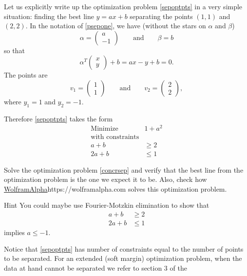 \documentclass{article}
\begin{document}
  \begin{example}
    Let us explicitly write up the optimization problem \eqref{sepoptpts} in
    a very simple situation: finding the best line $y = a x + b$ separating the points
    $(1, 1)$ and $(2, 2)$. In the notation of \eqref{psepone}, we have (without the
    stars on $\alpha$ and $\beta$)
    $$
    \alpha = \begin{pmatrix} a \\ -1 \end{pmatrix}\qquad\text{and}\qquad
    \beta = b
    $$
    so that
    $$
    \alpha^T \begin{pmatrix} x \\ y \end{pmatrix} + b = a x - y + b = 0.
    $$
    The points are
    $$
    v_1 = \begin{pmatrix} 1 \\ 1 \end{pmatrix}\qquad\text{and}\qquad
    v_2 = \begin{pmatrix} 2 \\ 2 \end{pmatrix},
    $$
    where $y_1 = 1$ and $y_2 = -1$.
    
    Therefore \eqref{sepoptpts} takes the form
  \begin{align}\label{concrsep}
 \text{Minimize}\qquad\quad &1 + a^2\\
     \text{with constraints}&\\
    a + b &\geq 2\\
    2 a + b&\leq 1
  \end{align}
  \end{example}

  \beginshex
  Solve the optimization problem \eqref{concrsep} and verify that the best line
  from the optimization problem is the one we expect it to be. Also, check how
  \url{WolframAlpha}{https://wolframalpha.com} solves this optimization problem.
  
  \begin{hideinbutton}{Hint}
    You could maybe use Fourier-Motzkin elimination to show that
    \begin{align*}
      a + b &\geq 2\\
    2 a + b&\leq 1
    \end{align*}
    implies $a \leq -1$.
  \end{hideinbutton}
  \endshex
  
  
  Notice that \eqref{sepoptpts} has number of constraints equal to the
  number of points to be separated. For an extended (soft margin)
  optimization problem, when the data at hand cannot be separated we
  refer to section 3 of the
\end{document}
